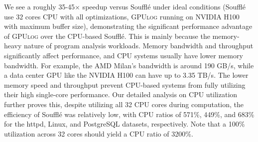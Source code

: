 \documentclass[nonacm,sigplan]{acmart}
\newcommand{\tool}{\textsc{GPUlog}}
\newcommand{\yihao}[1]{{#1}}
\begin{document}
\yihao{We see a roughly 35-45$\times$ speedup versus Souffl\'e under ideal conditions (Souffl\'e use $32$ cores CPU with all optimizations, \tool{} running on NVIDIA H100 with maximum buffer size), demonstrating the significant performance advantage of \tool{} over the CPU-based Souffl\'e. This is mainly because the memory-heavy nature of program analysis workloads. Memory bandwidth and throughput significantly affect performance, and CPU systems usually have lower memory bandwidth. For example, the AMD Milan's bandwidth is around 190 GB/s, while a data center GPU like the NVIDIA H100 can have up to 3.35 TB/s. The lower memory speed and throughput prevent CPU-based systems from fully utilizing their high single-core performance. Our detailed analysis on CPU utilization further proves this, despite utilizing all 32 CPU cores during computation, the efficiency of Souffl\'e was relatively low, with CPU ratios of 571\%, 449\%, and 683\% for the \textsf{httpd}, \textsf{Linux}, and \textsf{PostgreSQL} datasets, respectively. Note that a 100\% utilization across 32 cores should yield a CPU ratio of 3200\%. }
\end{document}
